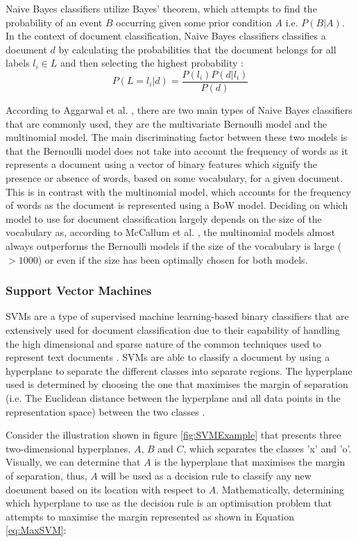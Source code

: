 \documentclass[a4paper,twoside,phd]{BYUPhys}
\begin{document}
Naive Bayes classifiers utilize Bayes' theorem, which attempts to find the probability of an event $B$ occurring given some prior condition $A$ i.e. $P(B| A)$. In the context of document classification, Naive Bayes classifiers classifies a document $d$ by calculating the probabilities that the document belongs for all labels $l_i \in L$ and then selecting the highest probability \cite{Allahyari2017}:
\begin{equation}
P(L = l_i| d) = \frac{P(l_i)P(d| l_i)}{P(d)}
\end{equation}

According to Aggarwal et al. \cite{Aggarwal2012}, there are two main types of Naive Bayes classifiers that are commonly used, they are the multivariate Bernoulli model and the multinomial model. The main discriminating factor between these two models is that the Bernoulli model does not take into account the frequency of words as it represents a document using a vector of binary features which signify the presence or absence of words, based on some vocabulary, for a given document. This is in contrast with the multinomial model, which accounts for the frequency of words as the document is represented using a BoW model. Deciding on which model to use for document classification largely depends on the size of the vocabulary as, according to McCallum et al. \cite{McCallum1998}, the multinomial models almost always outperforms the Bernoulli models if the size of the vocabulary is large ($> 1000$) or even if the size has been optimally chosen for both models.

\subsubsection{Support Vector Machines}
\label{sec:SVM}

SVMs are a type of supervised machine learning-based binary classifiers that are extensively used for document classification due to their capability of handling the high dimensional and sparse nature of the common techniques used to represent text documents \cite{Informatik1997}. SVMs are able to classify a document by using a hyperplane to separate the different classes into separate regions. The hyperplane used is determined by choosing the one that maximises the margin of separation (i.e. The Euclidean distance between the hyperplane and all data points in the representation space) between the two classes \cite{Aggarwal2012}.

Consider the illustration shown in figure \ref{fig:SVMExample} that presents three  two-dimensional hyperplanes, $A$, $B$ and $C$, which separates the classes 'x' and 'o'. Visually, we can determine that $A$ is the hyperplane that maximises the margin of separation, thus, $A$ will be used as a decision rule to classify any new document based on its location with respect to $A$. Mathematically, determining which hyperplane to use as the decision rule is an optimisation problem that attempts to maximise the margin represented as shown in Equation \ref{eq:MaxSVM}:
\end{document}
